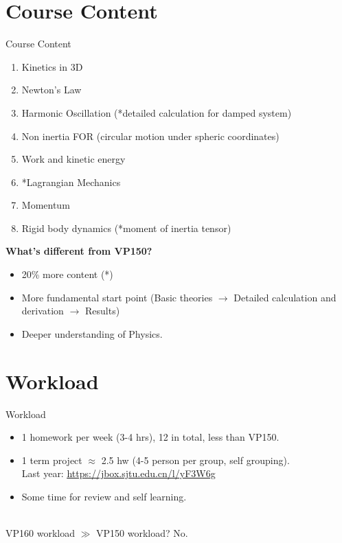 \documentclass{beamer}
\begin{document}
\section{Course Content}
\begin{frame}{Course Content}
    \begin{enumerate}
        \item Kinetics in 3D
        \item Newton's Law
        \item Harmonic Oscillation (*detailed calculation for damped system)
        \item Non inertia FOR (circular motion under spheric coordinates)
        \item Work and kinetic energy
        \item *Lagrangian Mechanics
        \item Momentum
        \item Rigid body dynamics (*moment of inertia tensor)
    \end{enumerate}
    \textbf{What's different from VP150?}\\
    \begin{itemize}
      \item 20\% more content (*)
      \item More fundamental start point (Basic theories $\to$ Detailed calculation and derivation $\to$ Results)
      \item Deeper understanding of Physics.
    \end{itemize}
\end{frame}

\section{Workload}
\begin{frame}{Workload}
  \begin{itemize}
    \item 1 homework per week (3-4 hrs), 12 in total, less than VP150.
    \item 1 term project $\approx $ 2.5 hw (4-5 person per group, self grouping).\\Last year: \underline{\small{\url{https://jbox.sjtu.edu.cn/l/yF3W6g}}}
    \item Some time for review and self learning.
  \end{itemize}
  ~\\
  \centering
  VP160 workload $\gg $ VP150 workload? No.
  \end{frame}
\end{document}
